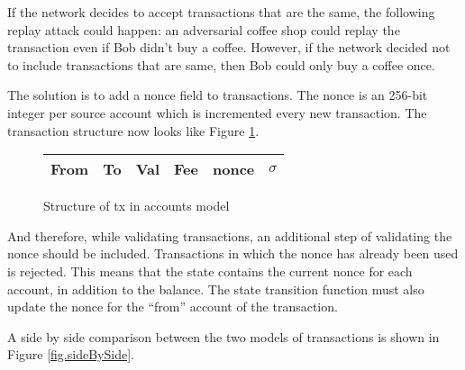If the network decides to accept transactions that are the same, the following replay attack could happen: an adversarial coffee shop could replay the transaction even if Bob didn't buy a coffee. However, if the network decided not to include transactions that are same, then Bob could only buy a coffee once.

The solution is to add a nonce field to transactions. The nonce is an 256-bit integer per source account which is incremented every new transaction. The transaction structure now looks like Figure \ref{fig.accountsTxWithNonce}.

\begin{figure}[ht]
\centering
    \begin{tabular}{|c|c|c|c|c|c|}
         \hline
         From & To & Val & Fee & \textbf{nonce} & {$\sigma$} \\
         \hline
    \end{tabular}
    \caption{Structure of tx in accounts model}
    \label{fig.accountsTxWithNonce}
\end{figure}

And therefore, while validating transactions, an additional step of validating the nonce should be included. Transactions in which the nonce
has already been used is rejected.
This means that the state contains the current nonce for each account, in addition to the balance.
The state transition function must also update the nonce for the ``from'' account of the transaction.

A side by side comparison between the two models  of transactions is shown in Figure \ref{fig.sideBySide}.

